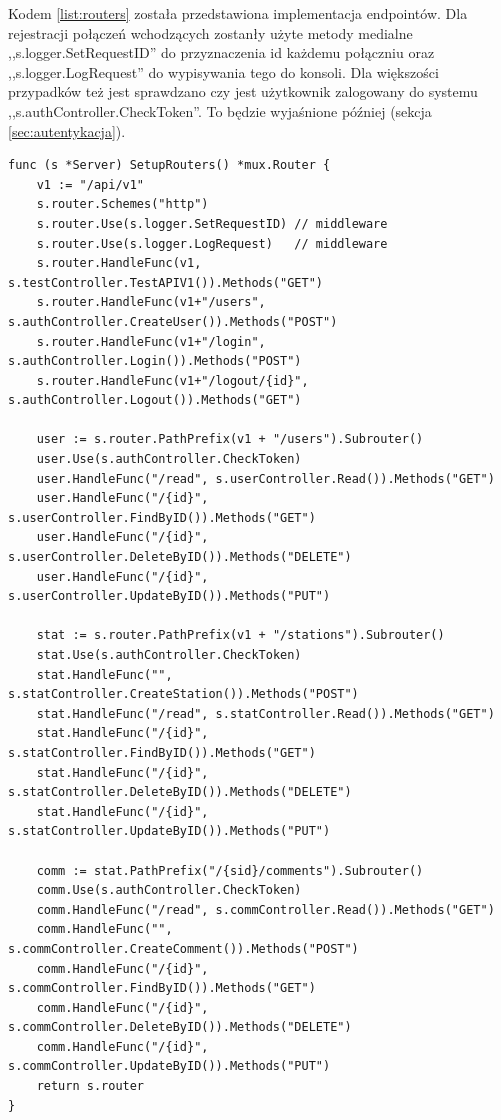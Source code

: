 \newpage
Kodem \ref{list:routers} została przedstawiona implementacja endpointów.
Dla rejestracji połączeń wchodzących zostanły użyte metody medialne ,,s.logger.SetRequestID'' do przyznaczenia id każdemu połączniu oraz ,,s.logger.LogRequest'' do wypisywania tego do konsoli.
Dla większości przypadków też jest sprawdzano czy jest użytkownik zalogowany do systemu ,,s.authController.CheckToken''. To będzie wyjaśnione później (sekcja \ref{sec:autentykacja}).
\begin{lstlisting}[label=list:routers,caption=Implementacja punktów końcowych,basicstyle=\tiny\ttfamily]
func (s *Server) SetupRouters() *mux.Router {
	v1 := "/api/v1"
	s.router.Schemes("http")
	s.router.Use(s.logger.SetRequestID) // middleware
	s.router.Use(s.logger.LogRequest)   // middleware
	s.router.HandleFunc(v1, s.testController.TestAPIV1()).Methods("GET")
	s.router.HandleFunc(v1+"/users", s.authController.CreateUser()).Methods("POST")
	s.router.HandleFunc(v1+"/login", s.authController.Login()).Methods("POST")
	s.router.HandleFunc(v1+"/logout/{id}", s.authController.Logout()).Methods("GET")

	user := s.router.PathPrefix(v1 + "/users").Subrouter()
	user.Use(s.authController.CheckToken)
	user.HandleFunc("/read", s.userController.Read()).Methods("GET")
	user.HandleFunc("/{id}", s.userController.FindByID()).Methods("GET")
	user.HandleFunc("/{id}", s.userController.DeleteByID()).Methods("DELETE")
	user.HandleFunc("/{id}", s.userController.UpdateByID()).Methods("PUT")

	stat := s.router.PathPrefix(v1 + "/stations").Subrouter()
	stat.Use(s.authController.CheckToken)
	stat.HandleFunc("", s.statController.CreateStation()).Methods("POST")
	stat.HandleFunc("/read", s.statController.Read()).Methods("GET")
	stat.HandleFunc("/{id}", s.statController.FindByID()).Methods("GET")
	stat.HandleFunc("/{id}", s.statController.DeleteByID()).Methods("DELETE")
	stat.HandleFunc("/{id}", s.statController.UpdateByID()).Methods("PUT")

	comm := stat.PathPrefix("/{sid}/comments").Subrouter()
	comm.Use(s.authController.CheckToken)
	comm.HandleFunc("/read", s.commController.Read()).Methods("GET")
	comm.HandleFunc("", s.commController.CreateComment()).Methods("POST")
	comm.HandleFunc("/{id}", s.commController.FindByID()).Methods("GET")
	comm.HandleFunc("/{id}", s.commController.DeleteByID()).Methods("DELETE")
	comm.HandleFunc("/{id}", s.commController.UpdateByID()).Methods("PUT")
	return s.router
}
\end{lstlisting}

